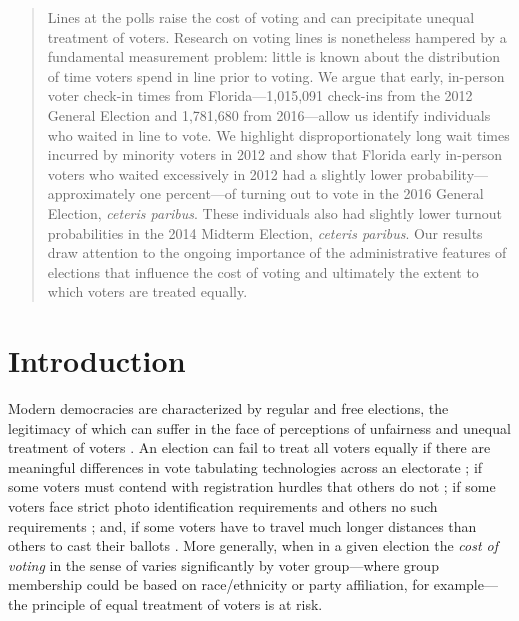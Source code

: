 \documentclass[12pt,titlepage]{article}
\begin{document}


\begin{abstract}
  \noindent 
  Lines at the polls raise the cost of voting and can precipitate
  unequal treatment of voters. \mbox{Research} on voting lines is
  nonetheless hampered by a fundamental measurement problem: little is
  known about the distribution of time voters spend in line prior to
  voting. We argue that early, in-person voter check-in times from
  Florida---1,015,091 check-ins from the 2012 General Election and
  1,781,680 from 2016---allow us identify individuals who waited in
  line to vote. We highlight disproportionately long wait times
  incurred by minority voters in 2012 and show that Florida early
  in-person voters who waited excessively in 2012 had a slightly lower
  probability---approximately one percent---of turning out to vote in
  the 2016 General Election, \emph{ceteris paribus}.  These
  individuals also had slightly lower turnout probabilities in the
  2014 Midterm Election, \emph{ceteris paribus}.  Our results draw
  attention to the ongoing importance of the administrative features
  of elections that influence the cost of voting and ultimately the
  extent to which voters are treated equally.
\end{abstract}


\newpage
\section*{Introduction}

Modern democracies are characterized by regular and free elections,
the legitimacy of which can suffer in the face of perceptions of
unfairness and unequal treatment of voters
\citep{norris2014electoral}. An election can fail to treat all voters
equally if there are meaningful differences in vote tabulating
technologies across an electorate \citep{kimballkropf:tech}; if some
voters must contend with registration hurdles that others do not
\citep{ansolhersh:registration}; if some voters face strict photo
identification requirements and others no such requirements
\citep{benteleetal:newjimcrow}; and, if some voters have to travel
much longer distances than others to cast their ballots
\citep{dyckgimpel:distance}. More generally, when in a given election
the \emph{cost of voting} in the sense of \cite{downs:econtheory}
varies significantly by voter group---where group membership could be
based on race/ethnicity or party affiliation, for example---the
principle of equal treatment of voters is at risk.
\end{document}
